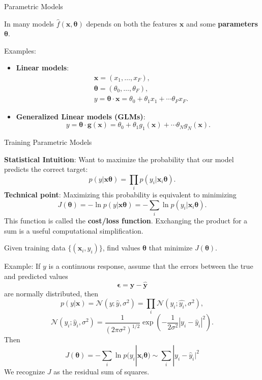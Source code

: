 \documentclass[12pt,t]{beamer}
\begin{document}
\begin{frame}{Parametric Models} 

In many models $ \hat{f}(\mathbf{x} , \bm{\theta})$ depends on both the features $\mathbf{x}$ and some {\bf parameters} $\bm{\theta}$.
\bigskip

Examples:
\begin{itemize}
\item {\bf Linear models}:
\begin{equation*} \begin{split}
& \mathbf{x} = (x_1, \ldots, x_F), \\
& \bm{\theta}  = (\theta_0, \ldots, \theta_F), \\
& y = \bm{\theta} \cdot \mathbf{x} = \theta_0 +  \theta_1 x_1 + \cdots  \theta_F x_F.
\end{split} \end{equation*}

\item {\bf Generalized Linear models (GLMs)}:
\begin{equation*}y = \bm{\theta} \cdot \bm{g}( \mathbf{x} )= \theta_0 +  \theta_1 g_1( \mathbf{x} ) + \cdots  \theta_N g_N( \mathbf{x} ).
 \end{equation*}
\end{itemize}

\end{frame}

\begin{frame}{Training Parametric Models}

{\bf Statistical Intuition}: Want to maximize the probability that our model predicts the correct target: 
$$p(y|\mathbf{x}\bm{\theta} ) = \prod_i p(y_i|\mathbf{x}_i\bm{\theta} ) .$$
{\bf Technical point}: Maximizing this probability is equivalent to minimizing
$$  J(\bm{\theta}) = - \ln p(y|\mathbf{x}\bm{\theta} )  = - \sum_i \ln p(y_i|\mathbf{x}_i\bm{\theta} ).$$
This function is called the  {\bf cost/loss function}.  Exchanging the product for a sum is a useful computational simplification.
\bigskip

Given training data $\{ (\mathbf{x}_i, y_i)\}$, find values $\bm{\theta}$ that minimize $J(\bm{\theta})$.

\end{frame}

\begin{frame}
Example: If $y$ is a continuous response, assume that the errors between the true and predicted values
$$ \mathbf{\epsilon} =\mathbf{ y} - \hat{\mathbf{y}} $$
are normally distributed, then 
$$ p(y | \mathbf{ x} ) = \mathcal{N}(y; \hat{y}, \sigma^2)= \prod_i  \mathcal{N}( y_i; \hat{ y_i}, \sigma^2),$$
$$  \mathcal{N}(y_i; \hat{y}_i, \sigma^2) 
	= \frac{1}{(2\pi \sigma^2)^{1/2}} \exp \left( - \frac{1}{2\sigma^2} |y_i - \hat{y}_i |^2 \right).$$
Then
$$J(\bm{\theta}) = - \sum_i \ln p(y_i|\mathbf{x}_i\bm{\theta} ) \sim  \sum_i  |y_i - \hat{y}_i |^2$$
We recognize $J$ as the residual sum of squares.
\end{frame}
\end{document}
